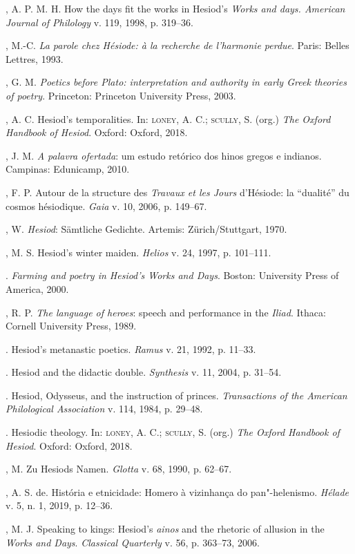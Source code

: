 \begin{bibliohedra}
, A. P. M. H. How the days fit the works in Hesiod's
\emph{Works and days. American Journal of Philology} v. 119, 1998, p.
319--36.

, M.-C. \emph{La parole chez Hésiode: à la recherche de
l'harmonie perdue}. Paris: Belles Lettres, 1993.

, G. M. \emph{Poetics before Plato: interpretation and
authority in early Greek theories of poetry}. Princeton: Princeton
University Press, 2003.

, A. C. Hesiod's temporalities. In: \textsc{loney}, A. C.; \textsc{scully}, S. (org.)
\emph{The Oxford Handbook of Hesiod}. Oxford: Oxford, 2018.

, J. M. \emph{A palavra ofertada}: um estudo retórico dos hinos
gregos e indianos. Campinas: Edunicamp, 2010.

, F. P. Autour de la structure des \emph{Travaux et les Jours}
d'Hésiode: la ``dualité'' du cosmos hésiodique. \emph{Gaia} v. 10, 2006,
p. 149--67.

, W. \emph{Hesiod}: Sämtliche Gedichte. Artemis: Zürich/Stuttgart,
1970.

, M. S. Hesiod's winter maiden. \emph{Helios} v. 24, 1997, p.
101--111.

\titidem. \emph{Farming and poetry in Hesiod's Works and Days}. Boston:
University Press of America, 2000.

, R. P. \emph{The language of heroes}: speech and performance in
the \emph{Iliad}. Ithaca: Cornell University Press, 1989.

\titidem. Hesiod's metanastic poetics. \emph{Ramus} v. 21, 1992, p. 11--33.

\titidem. Hesiod and the didactic double. \emph{Synthesis} v. 11, 2004, p.
31--54.

\titidem. Hesiod, Odysseus, and the instruction of princes.
\emph{Transactions of the American Philological Association} v. 114,
1984, p. 29--48.

\titidem. Hesiodic theology. In: \textsc{loney}, A. C.; \textsc{scully}, S. (org.) \emph{The
Oxford Handbook of Hesiod}. Oxford: Oxford, 2018.

, M. Zu Hesiods Namen. \emph{Glotta} v. 68, 1990, p. 62--67.

, A. S. de. História e etnicidade: Homero à vizinhança do
pan"-helenismo. \emph{Hélade} v. 5, n. 1, 2019, p. 12--36.

, M. J. Speaking to kings: Hesiod's \emph{ainos} and the rhetoric
of allusion in the \emph{Works and Days}. \emph{Classical Quarterly} v.
56, p. 363--73, 2006.


\end{bibliohedra}
